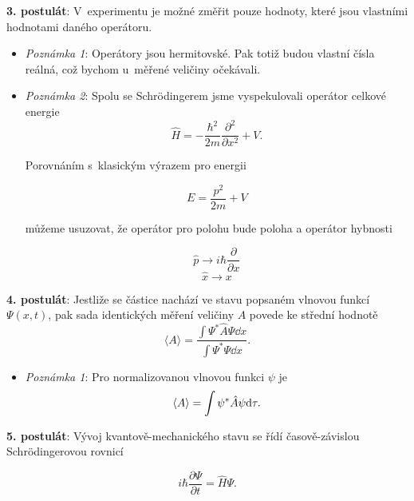 {\bf 3. postulát}: V~experimentu je možné změřit pouze hodnoty, které jsou vlastními hodnotami daného operátoru.
\begin{itemize}
\item \textit{Poznámka 1}: Operátory jsou hermitovské. Pak totiž budou vlastní čísla reálná, což bychom u~měřené veličiny očekávali.
\item \textit{Poznámka 2}: Spolu se Schr\"odingerem jsme vyspekulovali operátor celkové energie
\begin{equation}
\hat{H} = - \frac{\hbar^2}{2m}\frac{\partial ^2}{\partial x^2} + V \mbox{.}
\label{rov:Postulaty1}
\end{equation}

\noindent Porovnáním s~klasickým výrazem pro energii

\begin{equation}
E = \frac{p^2}{2m} + V
\label{rov:Postulaty2}
\end{equation}

\noindent můžeme usuzovat, že operátor pro polohu bude poloha a operátor hybnosti

\begin{equation}
\boxed{\hat{p} \rightarrow  i\hbar \frac{\partial}{\partial x}}
\label{rov:Postulaty3}
\end{equation}
\begin{equation}
\boxed{\hat{x} \rightarrow   x}
\label{rov:Postulaty4}
\end{equation}
\end{itemize}

{\bf 4. postulát}: Jestliže se částice nachází ve stavu popsaném vlnovou funkcí $\Psi(x,t)$, pak sada identických měření veličiny $A$ povede ke střední hodnotě
\begin{equation}
\boxed{\langle A \rangle = \frac{\int \Psi^*\hat{A}\Psi \dd x}{\int \Psi^*\Psi \dd x}\mbox{.}}
\label{rov:Postulaty5}
\end{equation}
\begin{itemize}
\item \textit{Poznámka 1}: Pro normalizovanou vlnovou funkci $\psi$ je
\begin{equation}
\braket{A} = \int \psi^{\ast} \hat{A} \psi \mathrm{d} \tau.
\end{equation}
\end{itemize}

{\bf 5. postulát}: Vývoj kvantově-mechanického stavu se řídí časově-závislou Schr\"odingerovou rovnicí

\begin{equation}
\boxed{i\hbar \frac{\partial \Psi}{\partial t} = \hat{H}\Psi \mbox{.}}
\label{rov:Postulaty6}
\end{equation}

